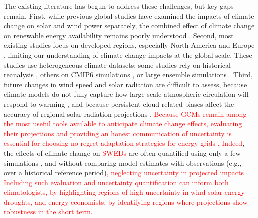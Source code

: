 \documentclass[pdflatex,sn-mathphys-num]{sn-jnl}%
\begin{document}
The existing literature has begun to address these challenges, but key gaps remain. First, while previous global studies have examined the impacts of climate change on solar and wind power separately, the combined effect of climate change on renewable energy availability remains poorly understood \cite{wangRisingWorldwideChallenges2025, liuClimateChangeImpacts2023}. Second, most existing studies focus on developed regions, especially North America and Europe \cite{Bracken2024, brownMeteorologyClimatologyHistorical2021, singhEnhancedSolarWind2024, RAYNAUD2018578, oteroCopulabasedAssessmentRenewable2022, kapicaPotentialImpactClimate2024}, limiting our understanding of climate change impacts at the global scale. These studies use heterogeneous climate datasets: some studies rely on historical reanalysis  \cite{RAYNAUD2018578}, others on CMIP6 simulations \cite{kapicaPotentialImpactClimate2024}, or large ensemble simulations \cite{vanderwielMeteorologicalConditionsLeading2019}. Third, future changes in wind speed and solar radiation are difficult to assess, because climate models do not fully capture how large-scale atmospheric circulation will respond to warming \cite{Shepherd2014}, and because persistent cloud-related biases affect the accuracy of regional solar radiation projections \cite{huangDiagnosingRadiationBiases2023}. \textcolor{red}{Because GCMs remain among the most useful tools available to anticipate climate change effects, evaluating their projections and providing an honest communication of uncertainty is essential for choosing no-regret adaptation strategies for energy grids \cite{douvilleAllClimateModels}.} \textcolor{red}{Indeed}, the effects of climate change on \textcolor{red}{SWEDs} are often quantified using only a few simulations \cite{brackenIntensifyingRenewableEnergy2025, wangRisingWorldwideChallenges2025}, and without comparing model estimates with observations (e.g., over a historical reference period)\textcolor{red}{, neglecting uncertainty in projected impacts} \cite{wilczakWindSolarEnergy2025}\textcolor{red}{. Including such evaluation and uncertainty quantification can inform both climatologists, by highlighting regions of high uncertainty in wind-solar energy droughts, and energy economists, by identifying regions where projections show robustness in the short term.} 
\end{document}
